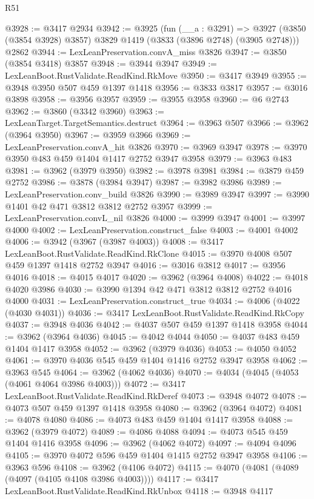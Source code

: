 \begin{lexlean}{R51}
\begin{coremodule}
@3928 := @3417 @2934
@3942 := @3925
    (fun (__a : @3291) =>
    @3927 (@3850 (@3854 @3928) @3857) @3829 @1419 (@3833 (@3896 @2748) (@3905 @2748)))
    @2862
@3944 := LexLeanPreservation.convA_miss @3826
@3947 := @3850 (@3854 @3418) @3857
@3948 := @3944 @3947
@3949 := LexLeanBoot.RustValidate.ReadKind.RkMove
@3950 := @3417 @3949
@3955 := @3948 @3950 @507 @459 @1397 @1418
@3956 := @3833 @3817
@3957 := @3016 @3898
@3958 := @3956 @3957
@3959 := @3955 @3958
@3960 := @6 @2743
@3962 := @3860 (@3342 @3960)
@3963 := LexLeanTarget.TargetSemantics.destruct
@3964 := @3963 @507
@3966 := @3962 (@3964 @3950)
@3967 := @3959 @3966
@3969 := LexLeanPreservation.convA_hit @3826
@3970 := @3969 @3947
@3978 := @3970 @3950 @483 @459 @1404 @1417 @2752 @3947 @3958
@3979 := @3963 @483
@3981 := @3962 (@3979 @3950)
@3982 := @3978 @3981
@3984 := @3879 @459 @2752
@3986 := @3878 (@3984 @3947)
@3987 := @3982 @3986
@3989 := LexLeanPreservation.conv_build @3826
@3990 := @3989 @3947
@3997 := @3990 @1401 @42 @471 @3812 @3812 @2752 @3957
@3999 := LexLeanPreservation.convL_nil @3826
@4000 := @3999 @3947
@4001 := @3997 @4000
@4002 := LexLeanPreservation.construct_false
@4003 := @4001 @4002
@4006 := @3942 (@3967 (@3987 @4003))
@4008 := @3417 LexLeanBoot.RustValidate.ReadKind.RkClone
@4015 := @3970 @4008 @507 @459 @1397 @1418 @2752 @3947
@4016 := @3016 @3812
@4017 := @3956 @4016
@4018 := @4015 @4017
@4020 := @3962 (@3964 @4008)
@4022 := @4018 @4020 @3986
@4030 := @3990 @1394 @42 @471 @3812 @3812 @2752 @4016 @4000
@4031 := LexLeanPreservation.construct_true
@4034 := @4006 (@4022 (@4030 @4031))
@4036 := @3417 LexLeanBoot.RustValidate.ReadKind.RkCopy
@4037 := @3948 @4036
@4042 := @4037 @507 @459 @1397 @1418 @3958
@4044 := @3962 (@3964 @4036)
@4045 := @4042 @4044
@4050 := @4037 @483 @459 @1404 @1417 @3958
@4052 := @3962 (@3979 @4036)
@4053 := @4050 @4052
@4061 := @3970 @4036 @545 @459 @1404 @1416 @2752 @3947 @3958
@4062 := @3963 @545
@4064 := @3962 (@4062 @4036)
@4070 := @4034 (@4045 (@4053 (@4061 @4064 @3986 @4003)))
@4072 := @3417 LexLeanBoot.RustValidate.ReadKind.RkDeref
@4073 := @3948 @4072
@4078 := @4073 @507 @459 @1397 @1418 @3958
@4080 := @3962 (@3964 @4072)
@4081 := @4078 @4080
@4086 := @4073 @483 @459 @1404 @1417 @3958
@4088 := @3962 (@3979 @4072)
@4089 := @4086 @4088
@4094 := @4073 @545 @459 @1404 @1416 @3958
@4096 := @3962 (@4062 @4072)
@4097 := @4094 @4096
@4105 := @3970 @4072 @596 @459 @1404 @1415 @2752 @3947 @3958
@4106 := @3963 @596
@4108 := @3962 (@4106 @4072)
@4115 := @4070 (@4081 (@4089 (@4097 (@4105 @4108 @3986 @4003))))
@4117 := @3417 LexLeanBoot.RustValidate.ReadKind.RkUnbox
@4118 := @3948 @4117

\end{coremodule}
\end{lexlean}
